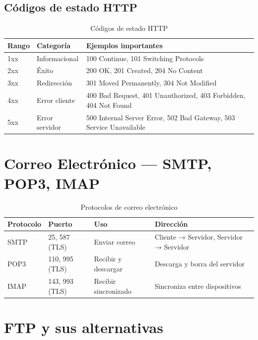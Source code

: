 \subsection{Códigos de estado HTTP}

\begin{table}[h!]
\centering
\renewcommand{\arraystretch}{1.3}
\begin{tabular}{lll}
\toprule
\textbf{Rango} & \textbf{Categoría} & \textbf{Ejemplos importantes} \\
\midrule
1xx & Informacional  & 100 Continue, 101 Switching Protocols \\
2xx & Éxito          & 200 OK, 201 Created, 204 No Content \\
3xx & Redirección    & 301 Moved Permanently, 304 Not Modified \\
4xx & Error cliente  & 400 Bad Request, 401 Unauthorized, 403 Forbidden, 404 Not Found \\
5xx & Error servidor & 500 Internal Server Error, 502 Bad Gateway, 503 Service Unavailable \\
\bottomrule
\end{tabular}
\caption{Códigos de estado HTTP}
\end{table}

\section{ Correo Electrónico --- SMTP, POP3, IMAP}

\begin{table}[h!]
\centering
\renewcommand{\arraystretch}{1.3}
\begin{tabular}{llll}
\toprule
\textbf{Protocolo} & \textbf{Puerto} & \textbf{Uso} & \textbf{Dirección} \\
\midrule
SMTP     & 25, 587 (TLS) & Enviar correo             & Cliente → Servidor, Servidor → Servidor \\
POP3     & 110, 995 (TLS) & Recibir y descargar       & Descarga y borra del servidor \\
IMAP     & 143, 993 (TLS) & Recibir sincronizado      & Sincroniza entre dispositivos \\
\bottomrule
\end{tabular}
\caption{Protocolos de correo electrónico}
\end{table}

\section{ FTP y sus alternativas}


